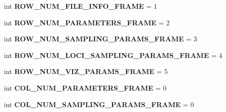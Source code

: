 \begin{DoxyCompactItemize}
\item 
int {\bfseries R\+O\+W\+\_\+\+N\+U\+M\+\_\+\+F\+I\+L\+E\+\_\+\+I\+N\+F\+O\+\_\+\+F\+R\+A\+ME} = 1\hypertarget{namespacenegui_1_1pgguineestimator__experimental_a67fea4a55d380b13dd9fb3bb7cba916d}{}\label{namespacenegui_1_1pgguineestimator__experimental_a67fea4a55d380b13dd9fb3bb7cba916d}

\item 
int {\bfseries R\+O\+W\+\_\+\+N\+U\+M\+\_\+\+P\+A\+R\+A\+M\+E\+T\+E\+R\+S\+\_\+\+F\+R\+A\+ME} = 2\hypertarget{namespacenegui_1_1pgguineestimator__experimental_af61c45f5c0945190ebb61dc6a3c1c984}{}\label{namespacenegui_1_1pgguineestimator__experimental_af61c45f5c0945190ebb61dc6a3c1c984}

\item 
int {\bfseries R\+O\+W\+\_\+\+N\+U\+M\+\_\+\+S\+A\+M\+P\+L\+I\+N\+G\+\_\+\+P\+A\+R\+A\+M\+S\+\_\+\+F\+R\+A\+ME} = 3\hypertarget{namespacenegui_1_1pgguineestimator__experimental_a396466da924d1c0aee0c4ca51fe19f00}{}\label{namespacenegui_1_1pgguineestimator__experimental_a396466da924d1c0aee0c4ca51fe19f00}

\item 
int {\bfseries R\+O\+W\+\_\+\+N\+U\+M\+\_\+\+L\+O\+C\+I\+\_\+\+S\+A\+M\+P\+L\+I\+N\+G\+\_\+\+P\+A\+R\+A\+M\+S\+\_\+\+F\+R\+A\+ME} = 4\hypertarget{namespacenegui_1_1pgguineestimator__experimental_a3ef37d610e6076d2498516e6383ed84d}{}\label{namespacenegui_1_1pgguineestimator__experimental_a3ef37d610e6076d2498516e6383ed84d}

\item 
int {\bfseries R\+O\+W\+\_\+\+N\+U\+M\+\_\+\+V\+I\+Z\+\_\+\+P\+A\+R\+A\+M\+S\+\_\+\+F\+R\+A\+ME} = 5\hypertarget{namespacenegui_1_1pgguineestimator__experimental_ac8b25057ba9870d0b51b7ded11ef9656}{}\label{namespacenegui_1_1pgguineestimator__experimental_ac8b25057ba9870d0b51b7ded11ef9656}

\item 
int {\bfseries C\+O\+L\+\_\+\+N\+U\+M\+\_\+\+P\+A\+R\+A\+M\+E\+T\+E\+R\+S\+\_\+\+F\+R\+A\+ME} = 0\hypertarget{namespacenegui_1_1pgguineestimator__experimental_a45177073f83ee16e215a81cf699e4327}{}\label{namespacenegui_1_1pgguineestimator__experimental_a45177073f83ee16e215a81cf699e4327}

\item 
int {\bfseries C\+O\+L\+\_\+\+N\+U\+M\+\_\+\+S\+A\+M\+P\+L\+I\+N\+G\+\_\+\+P\+A\+R\+A\+M\+S\+\_\+\+F\+R\+A\+ME} = 0\hypertarget{namespacenegui_1_1pgguineestimator__experimental_a63a54bf69445a35af4e1d4f1b5594ea4}{}\label{namespacenegui_1_1pgguineestimator__experimental_a63a54bf69445a35af4e1d4f1b5594ea4}


\end{DoxyCompactItemize}

